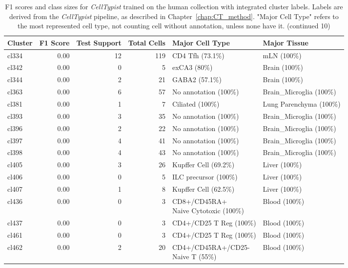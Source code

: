 \begin{table}[ht!]
\scriptsize
\caption[F1 scores and class sizes for \textit{CellTypist} trained on the human collection with integrated cluster labels (continued 10)]{F1 scores and class sizes for \textit{CellTypist} trained on the human collection with integrated cluster labels. Labels are derived from the \textit{CellTypist} pipeline, as described in Chapter~\ref{chap:CT_method}. "Major Cell Type" refers to the most represented cell type, not counting cell without annotation, unless none have it. (continued 10)}
\centering
\label{table:tab_HAmodelclust10}
\begin{tabular}{lrrrll}
  \toprule
Cluster & F1 Score & Test Support & Total Cells & Major Cell Type & Major Tissue \\ 
  \midrule  
  cl334 & 0.00 &  12 & 119 & CD4 Tfh (73.1\%) & mLN (100\%) \\ 
  cl342 & 0.00 &   0 &   5 & exCA3 (80\%) & Brain (100\%) \\ 
  cl344 & 0.00 &   2 &  21 & GABA2 (57.1\%) & Brain (100\%) \\ 
  cl363 & 0.00 &   6 &  57 & No annotation (100\%) & Brain\_Microglia (100\%) \\ 
  cl381 & 0.00 &   1 &   7 & Ciliated (100\%) & Lung Parenchyma (100\%) \\ 
  cl393 & 0.00 &   3 &  35 & No annotation (100\%) & Brain\_Microglia (100\%) \\ 
  cl396 & 0.00 &   2 &  22 & No annotation (100\%) & Brain\_Microglia (100\%) \\ 
  cl397 & 0.00 &   4 &  41 & No annotation (100\%) & Brain\_Microglia (100\%) \\ 
  cl398 & 0.00 &   4 &  43 & No annotation (100\%) & Brain\_Microglia (100\%) \\ 
  cl405 & 0.00 &   3 &  26 & Kupffer Cell (69.2\%) & Liver (100\%) \\ 
  cl406 & 0.00 &   0 &   5 & ILC precursor (100\%) & Liver (100\%) \\ 
  cl407 & 0.00 &   1 &   8 & Kupffer Cell (62.5\%) & Liver (100\%) \\ 
  cl436 & 0.00 &   0 &   3 & \specialcell[t]{CD8+/CD45RA+\\Naive Cytotoxic (100\%)} & Blood (100\%) \\ 
  cl437 & 0.00 &   0 &   3 & CD4+/CD25 T Reg (100\%) & Blood (100\%) \\ 
  cl461 & 0.00 &   0 &   3 & CD4+/CD25 T Reg (100\%) & Blood (100\%) \\ 
  cl462 & 0.00 &   2 &  20 & \specialcell[t]{CD4+/CD45RA+/CD25-\\Naive T (55\%)} & Blood (100\%) \\ 

\end{tabular}
\end{table}
